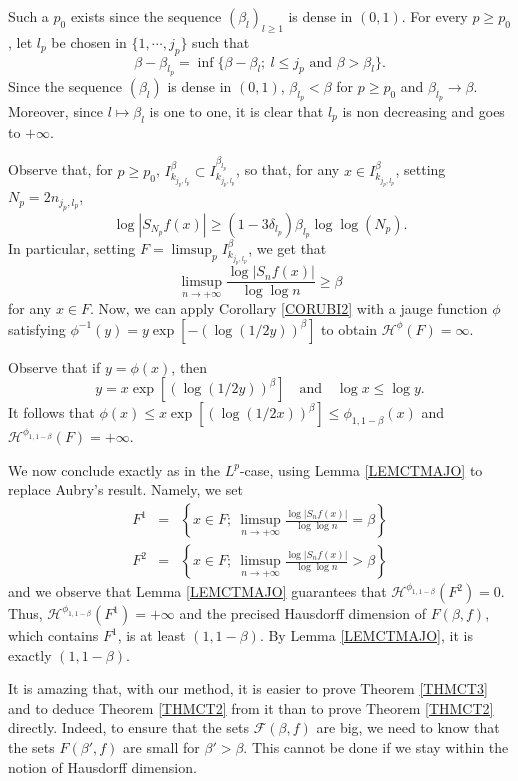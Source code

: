 \documentclass[11pt,a4paper]{amsart}
\theoremstyle{plain}
\begin{document}
Such a $p_0$ exists since the sequence $(\beta_l)_{l\ge 1}$ is dense in
$(0,1)$. For every $p\ge p_0$, let $l_p$ be chosen in $\{1,\cdots, j_p\}$
such that 
$$\beta-\beta_{l_p}=\inf\{\beta-\beta_l;\ l\leq j_p\textrm{ and }\beta >\beta_l\}.$$
Since the sequence $(\beta_l)$ is dense in $(0,1)$, $\beta_{l_p}<\beta$ for $p\geq p_0$
and $\beta_{l_p}\to \beta$. Moreover, since $l\mapsto \beta_l$ is one to one,
it is clear that $l_p$ is non decreasing and goes to $+\infty$.

Observe that, for $p\geq p_0$, $I_{k_{j_p,l_p}}^{\beta}\subset I_{k_{j_p,l_p}}^{\beta_{l_p}}$, so that,
for any $x\in I_{k_{j_p,l_p}}^{\beta}$, setting $N_p=2n_{j_p,l_p}$,
$$\log |S_{N_p}f(x)|\geq (1-3\delta_{l_p})\beta_{l_p}\log\log(N_p).$$
In particular, setting $F=\limsup_p I_{k_{j_p,l_p}}^\beta$, we get that
$$\limsup_{n\to+\infty}\frac{\log |S_n f(x)|}{\log\log n}\geq \beta$$
for any $x\in F$. Now, we can apply Corollary \ref{CORUBI2} with a jauge
function $\phi$ satisfying 
$\phi^{-1}(y)=y\exp\left[-(\log(1/2y))^{\beta}\right]$ to obtain ${\mathcal
  H}^\phi(F)=\infty$. 

Observe that if $y=\phi(x)$, then
$$y=x\exp\left[(\log(1/2y))^{\beta}\right]
\quad\text{and}\quad \log x\le \log y.$$
It follows that $\phi(x)\le
x\exp\left[(\log(1/2x))^{\beta}\right]\le\phi_{1,1-\beta}(x)$ and  
${\mathcal H}^{\phi_{1,1-\beta}}(F)=+\infty$.

We now conclude exactly as in the $L^p$-case, using Lemma \ref{LEMCTMAJO} to replace Aubry's result. Namely, we set 
\begin{eqnarray*}
F^1&=&\left\{x\in F;\ \limsup_{n\to+\infty}\frac{\log |S_n f(x)|}{\log\log n}= \beta\right\}\\
F^2&=&\left\{x\in F;\ \limsup_{n\to+\infty}\frac{\log |S_n f(x)|}{\log\log n}> \beta\right\}
\end{eqnarray*}
and we observe that Lemma \ref{LEMCTMAJO} guarantees that ${\mathcal H}^{\phi_{1,1-\beta}}(F^2)=0$. Thus,
${\mathcal H}^{\phi_{1,1-\beta}}(F^1)=+\infty$ and the precised Hausdorff dimension of $F(\beta,f)$, which contains $F^1$, is at least $(1,1-\beta)$.
By Lemma \ref{LEMCTMAJO}, it is exactly $(1,1-\beta)$. 

\begin{remark}
 It is amazing that, with our method, it is easier to prove Theorem \ref{THMCT3} and to deduce Theorem
  \ref{THMCT2} from it than to prove Theorem \ref{THMCT2} directly. Indeed, to ensure that the sets
   $\mathcal F(\beta,f)$ are big, we need to know that the sets $F(\beta',f)$ are small for $\beta'>\beta$. This cannot be done if we stay within the notion of Hausdorff dimension.
\end{remark}
\end{document}
